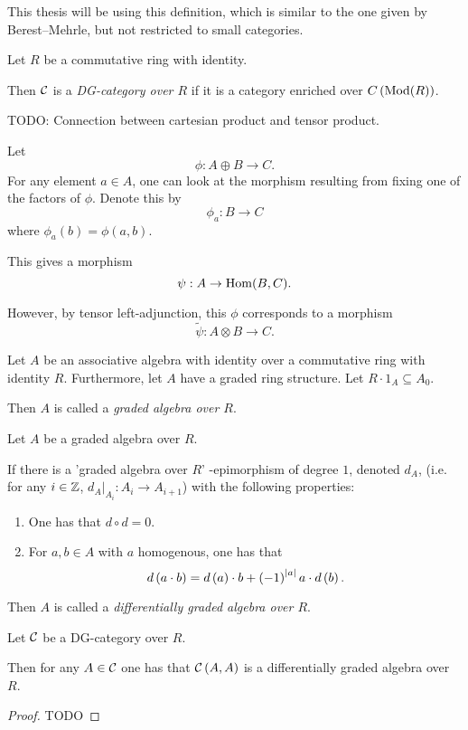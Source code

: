 This thesis will be using this definition, which is similar to the one given by Berest--Mehrle, but not restricted to small categories.
\begin{definition}
    Let \( R \) be a commutative ring with identity.

    Then \( {\mathcal{C}} \) is a \emph{DG-category over \( R \)} if it is a category enriched over \( C \left( \operatorname{Mod}(R) \right) \).
\end{definition}

\begin{remark}
    TODO: Connection between cartesian product and tensor product.

    Let
    \[
        \phi: A \oplus B \to C.
    \]
    For any element \( a \in A \), one can look at the morphism resulting from fixing one of the factors of \( \phi \). Denote this by
    \[
        \phi_a: B \to C
    \]
    where \( \phi_a(b) = \phi(a, b) \).
    
    This gives a morphism
    \[
        \psi: A \to \operatorname{Hom}(B, C).
    \]

    However, by tensor left-adjunction, this \( \phi \) corresponds to a morphism
    \[
        \tilde{\psi}: A \otimes B \to C.
    \]
\end{remark}

\begin{definition}
    Let \( A \) be an associative algebra with identity over a commutative ring with identity \( R \). Furthermore, let \( A \) have a graded ring structure. Let \( R \cdot 1_A \subseteq A_0 \).

    Then \( A \) is called a \emph{graded algebra over \( R \)}.
\end{definition}

\begin{definition}
    Let \( A \) be a graded algebra over \( R \).

    If there is a 'graded algebra over \( R \)' -epimorphism of degree \( 1 \), denoted \( d_A \), (i.e. for any \( i \in {\mathbb{Z}} \), \( d_A |_{A_i}: A_i \to A_{i + 1} \))
    with the following properties:
    \begin{enumerate}
        \item One has that \( d \circ d = 0 \).
        \item {
            For \( a, b \in A \) with \( a \) homogenous, one has that
            \[
                d\left( a \cdot b \right)
                =
                d\left( a \right) \cdot b + \left( -1 \right)^{\lvert a \rvert}a \cdot d\left( b \right).
            \]
            }
    \end{enumerate}

    Then \( A \) is called a \emph{differentially graded algebra over \( R \)}.
\end{definition}

\begin{theorem}
    Let \( {\mathcal{C}} \) be a DG-category over \( R \).

    Then for any \( A \in {\mathcal{C}} \) one has that \( {\mathcal{C}} \left( A, A \right) \) is a differentially graded algebra over \( R \).
\end{theorem}

\begin{proof}
    TODO
\end{proof}

